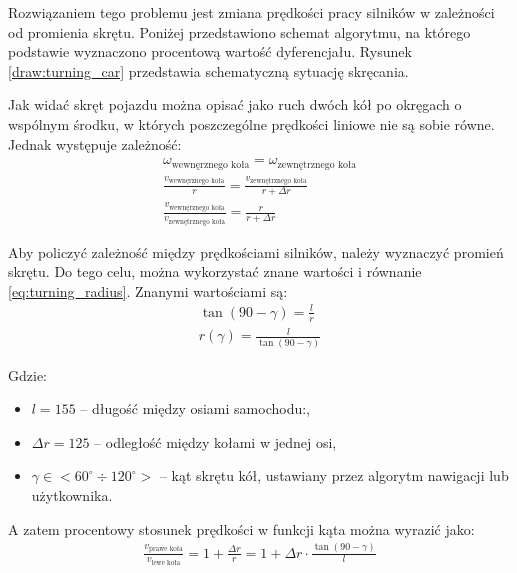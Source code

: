         Rozwiązaniem tego problemu jest zmiana prędkości pracy silników w zależności od promienia skrętu.
        Poniżej przedstawiono schemat algorytmu, na którego podstawie wyznaczono procentową wartość dyferencjału.
        Rysunek \ref{draw:turning_car} przedstawia schematyczną sytuację skręcania.
        

        Jak widać skręt pojazdu można opisać jako ruch dwóch kół po okręgach o wspólnym środku, w których poszczególne prędkości liniowe nie są sobie równe.
        Jednak występuje zależność:
        \begin{gather}
            \omega_{\text{wewnęrznego koła}} = \omega_{\text{zewnętrznego koła}}\\
            \frac{v_{\text{wewnęrznego koła}}}{r} = \frac{v_{\text{zewnętrznego koła}}}{r + \Delta r}\\
            \frac{v_\text{wewnęrznego koła}}{v_{\text{zewnętrznego koła}}} = \frac{r}{r + \Delta r}
        \end{gather}

        Aby policzyć zależność między prędkościami silników, należy wyznaczyć promień skrętu.
        Do tego celu, można wykorzystać znane wartości i równanie \ref{eq:turning_radius}.
        Znanymi wartościami są:
        \begin{gather}
            \tan \left(90 - \gamma\right) = \frac{l}{r}\\
            r(\gamma) = \frac{l}{\tan(90-\gamma)}
            \label{eq:turning_radius}
        \end{gather}

        Gdzie:
        \begin{itemize}
            \item $l = 155$ -- długość między osiami samochodu:,
            \item $\Delta r = 125$ -- odległość między kołami w jednej osi,
            \item $\gamma \in <60^\circ \div 120^\circ>$ -- kąt skrętu kół, ustawiany przez algorytm nawigacji lub użytkownika.
        \end{itemize}

        A zatem procentowy stosunek prędkości w funkcji kąta można wyrazić jako:
        \begin{gather}
            \frac{v_{\text{prawe koła}}}{v_{\text{lewe koła}}} = 1 + \frac{\Delta r}{r} = 1 + \Delta r \cdot \frac{\tan(90 - \gamma)}{l}
        \end{gather}


